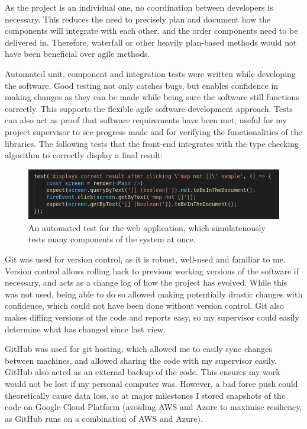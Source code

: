 \documentclass[a4paper,fleqn,oneside,12pt]{report}
\begin{document}
As the project is an individual one, no coordination between developers is necessary. This reduces the need to precisely plan and document how the components will integrate with each other, and the order components need to be delivered in. Therefore, waterfall or other heavily plan-based methods would not have been beneficial over agile methods.

Automated unit, component and integration tests were written while developing the software. Good testing not only catches bugs, but enables confidence in making changes as they can be made while being sure the software still functions correctly. This supports the flexible agile software development approach. Tests can also act as proof that software requirements have been met, useful for my project supervisor to see progress made and for verifying the functionalities of the libraries. The following tests that the front-end integrates with the type checking algorithm to correctly display a final result:

\begin{figure}[h!]
  \centering
  \includegraphics[width=1.000\linewidth]{images/image18.png}
  \caption{An automated test for the web application, which simulatenously tests many components of the system at once.}
\end{figure}

Git was used for version control, as it is robust, well-used and familiar to me. Version control allows rolling back to previous working versions of the software if necessary, and acts as a change log of how the project has evolved. While this was not used, being able to do so allowed making potentially drastic changes with confidence, which could not have been done without version control. Git also makes diffing versions of the code and reports easy, so my supervisor could easily determine what has changed since last view.

GitHub was used for git hosting, which allowed me to easily sync changes between machines, and allowed sharing the code with my supervisor easily. GitHub also acted as an external backup of the code. This ensures my work would not be lost if my personal computer was. However, a bad force push could theoretically cause data loss, so at major milestones I stored snapshots of the code on Google Cloud Platform (avoiding AWS and Azure to maximise resiliency, as GitHub runs on a combination of AWS and Azure).
\end{document}

